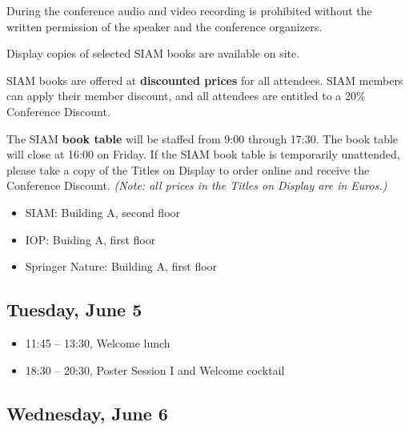 During the conference audio and video recording is prohibited without the written permission of the speaker and the conference organizers.


\noindent Display copies of selected SIAM books are available on site.

\bigskip

\noindent SIAM books are offered at \textbf{discounted prices} for all attendees. 
SIAM members can apply their member discount, and all attendees are entitled to a 20\% Conference Discount.

\bigskip

\noindent The SIAM \textbf{book table} will be staffed from 9:00 through 17:30. 
The book table will close at 16:00 on Friday. 
If the SIAM book table is temporarily unattended, please take a copy of the Titles on Display to order online and receive the Conference Discount. 
\textit{(Note: all prices in the Titles on Display are in Euros.)}


\begin{itemize}
  \item SIAM: Building A, second floor
  \item IOP: Buiding A, first floor
  \item Springer Nature: Building A, first floor
\end{itemize}


\subsection*{Tuesday, June 5}

\begin{itemize}
  \item[] 11:45 -- 13:30, Welcome lunch
  \item[] 18:30 -- 20:30, Poster Session I and Welcome cocktail
\end{itemize}

\subsection*{Wednesday, June 6}


